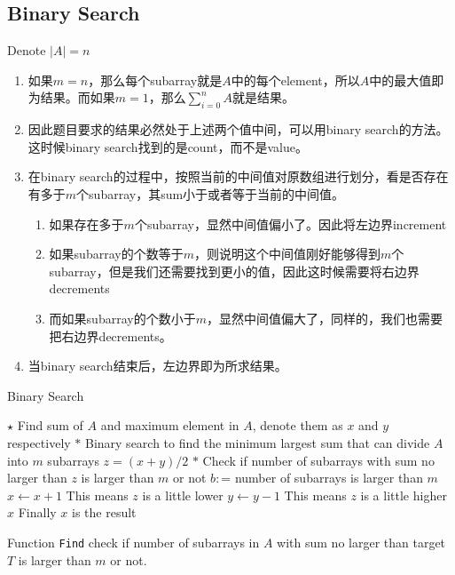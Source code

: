 \subsection{Binary Search}
Denote $\lvert A\rvert = n$
\begin{enumerate}
\item 如果$m = n$，那么每个subarray就是$A$中的每个element，所以$A$中的最大值即为结果。而如果$m=1$，那么$\sum\limits_{i=0}^{n} A$就是结果。
\item 因此题目要求的结果必然处于上述两个值中间，可以用binary search的方法。这时候binary search找到的是count，而不是value。
\item 在binary search的过程中，按照当前的中间值对原数组进行划分，看是否存在有多于$m$个subarray，其sum小于或者等于当前的中间值。
\begin{enumerate}
\item 如果存在多于$m$个subarray，显然中间值偏小了。因此将左边界increment
\item 如果subarray的个数等于$m$，则说明这个中间值刚好能够得到$m$个subarray，但是我们还需要找到更小的值，因此这时候需要将右边界decrements
\item 而如果subarray的个数小于$m$，显然中间值偏大了，同样的，我们也需要把右边界decrements。
\end{enumerate}
\item 当binary search结束后，左边界即为所求结果。
\end{enumerate}

\setcounter{algorithm}{0}
\begin{algorithm}[H]
\caption{Binary Search}
\begin{algorithmic}[1]
\State $\star$ Find sum of $A$ and maximum element in $A$, denote them as $x$ and $y$ respectively
\State $\ast$ Binary search to find the minimum largest sum that can divide $A$ into $m$ subarrays
\State $z=(x+y)/2$
\State $\ast$  Check if number of subarrays with sum no larger than $z$ is larger than $m$ or not
\State $b:$= 
 \Comment number of subarrays is larger than $m$
\State $x\gets x+1$ \Comment This means $z$ is a little lower
\Else
\State $y\gets y-1$ \Comment This means $z$ is a little higher
\EndIf
\EndWhile
\State \Return $x$ \Comment Finally $x$ is the result
\EndProcedure
\end{algorithmic}
\end{algorithm}
Function \texttt{Find} check if number of subarrays in $A$ with sum no larger than target $T$ is larger than $m$ or not.

